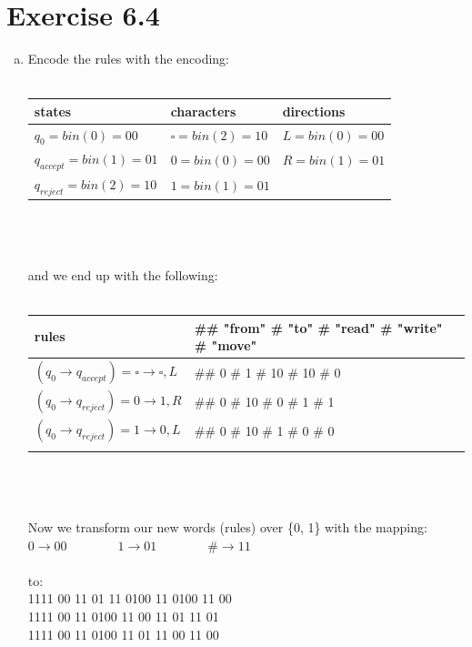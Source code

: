 \documentclass{article} %
\newcommand{\homeworkNumber}{6}
\begin{document}
\section*{Exercise \homeworkNumber.4}
\begin{enumerate}[(a)]
\item
Encode the rules with the encoding:\\\\

\begin{tabular}{ l | l | l }
states & characters & directions\\
\hline
$ q_0 = bin(0) = 00 $ & $ \square = bin(2) = 10 $ & $ L = bin(0) = 00 $\\
$ q_{accept} = bin(1) = 01 $ & $ 0 = bin(0) = 00 $ & $ R = bin(1) = 01 $\\
$ q_{reject} = bin(2) = 10 $ & $ 1 = bin(1) = 01 $ & \\
\end{tabular}\\\\\\

and we end up with the following:\\\\

\begin{tabular}{ l | l }
rules & \#\# "from" \# "to" \# "read" \# "write" \# "move"\\
\hline
$(q_0 \to q_{accept}) = \square \to \square, L $ & \#\# 0 \# 1 \# 10 \# 10 \# 0\\
$(q_0 \to q_{reject}) = 0 \to 1, R $ & \#\# 0 \# 10 \# 0 \# 1 \# 1\\
$(q_0 \to q_{reject}) = 1 \to 0, L $ & \#\# 0 \# 10 \# 1 \# 0 \# 0\\\\
\end{tabular}\\\\\\ 

Now we transform our new words (rules) over \{0, 1\} with the mapping:\\
$0 \to 00 \qquad \qquad 1 \to 01 \qquad \qquad \# \to 11$\\\\
to:\\
1111 00 11 01 11 0100 11 0100 11 00\\
1111 00 11 0100 11 00 11 01 11 01\\
1111 00 11 0100 11 01 11 00 11 00\\\\


\end{enumerate}
\end{document}
